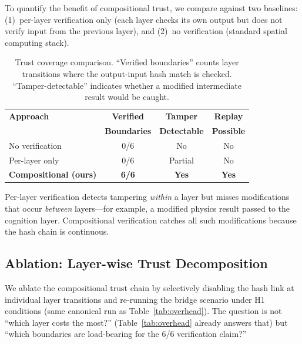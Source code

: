 \documentclass[sigchi-a]{acmart}
\begin{document}
To quantify the benefit of compositional trust, we compare against two
baselines: (1)~per-layer verification only (each layer checks its own
output but does not verify input from the previous layer), and (2)~no
verification (standard spatial computing stack).

\begin{table}[t]
  \caption{Trust coverage comparison. ``Verified boundaries'' counts
  layer transitions where the output-input hash match is checked.
  ``Tamper-detectable'' indicates whether a modified intermediate result
  would be caught.}
  \label{tab:comparison}
  \small
  \begin{tabular}{lccc}
    \toprule
    \textbf{Approach} & \textbf{Verified} & \textbf{Tamper} & \textbf{Replay} \\
    & \textbf{Boundaries} & \textbf{Detectable} & \textbf{Possible} \\
    \midrule
    No verification     & 0/6 & No  & No  \\
    Per-layer only      & 0/6 & Partial & No \\
    \textbf{Compositional (ours)} & \textbf{6/6} & \textbf{Yes} & \textbf{Yes} \\
    \bottomrule
  \end{tabular}
\end{table}

Per-layer verification detects tampering \emph{within} a layer but misses
modifications that occur \emph{between} layers---for example, a modified
physics result passed to the cognition layer. Compositional verification
catches all such modifications because the hash chain is continuous.

\subsection{Ablation: Layer-wise Trust Decomposition}
\label{sec:eval:ablation}

We ablate the compositional trust chain by selectively disabling the
hash link at individual layer transitions and re-running the bridge
scenario under H1 conditions (same canonical run as
Table~\ref{tab:overhead}).  The question is not ``which layer costs
the most?'' (Table~\ref{tab:overhead} already answers that) but ``which
boundaries are load-bearing for the 6/6 verification claim?''
\end{document}
